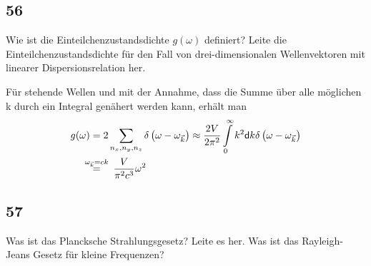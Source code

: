 \subsection{56}
\begin{myfrag}
Wie ist die Einteilchenzustandsdichte $g(\omega )$ definiert? Leite die
Einteilchenzustandsdichte für den Fall von drei-dimensionalen
Wellenvektoren mit linearer Dispersionsrelation her.
\end{myfrag}
Für stehende Wellen und mit der Annahme, dass die Summe über alle möglichen k durch ein Integral genähert werden kann, erhält man
\begin{align}
	g(\omega)&=2\sum\limits_{n_x,n_y,n_z}\delta\left(\omega-\omega_{\vec{k}}\right)\approx\frac{2V}{2\pi^2}\int\limits_0^\infty k^2\dif k\delta\left(\omega-\omega_{\vec{k}}\right)\\
	&\overset{\omega_{\vec{k}}=ck}=\frac{V}{\pi^2c^3}\omega^2
\end{align}
\subsection{57}
\begin{myfrag}
Was ist das Plancksche Strahlungsgesetz? Leite es her. Was ist das
Rayleigh-Jeans Gesetz für kleine Frequenzen?
\end{myfrag}
